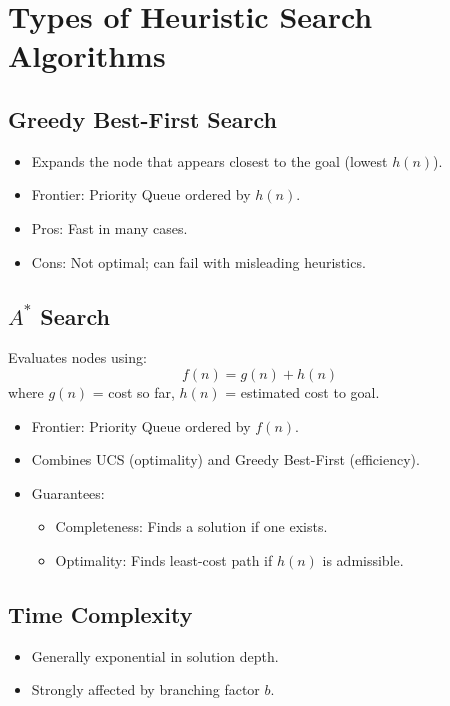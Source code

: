 

\section{Types of Heuristic Search Algorithms}

\subsection{Greedy Best-First Search}
\begin{itemize}
    \item Expands the node that appears closest to the goal (lowest $h(n)$).
    \item Frontier: Priority Queue ordered by $h(n)$.
    \item Pros: Fast in many cases.
    \item Cons: Not optimal; can fail with misleading heuristics.
\end{itemize}

\subsection{$A^*$ Search}
Evaluates nodes using:
\[
f(n) = g(n) + h(n)
\]
where $g(n)$ = cost so far, $h(n)$ = estimated cost to goal.
\begin{itemize}
    \item Frontier: Priority Queue ordered by $f(n)$.
    \item Combines UCS (optimality) and Greedy Best-First (efficiency).
    \item Guarantees:
    \begin{itemize}
        \item Completeness: Finds a solution if one exists.
        \item Optimality: Finds least-cost path if $h(n)$ is admissible.
    \end{itemize}
\end{itemize}

\subsection{Time Complexity}
\begin{itemize}
    \item Generally exponential in solution depth.
    \item Strongly affected by branching factor $b$.
\end{itemize}

